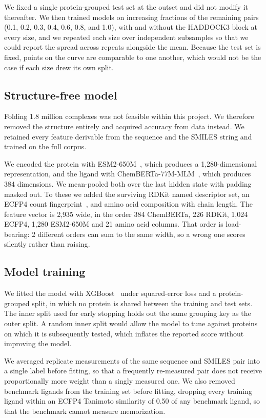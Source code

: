 \documentclass[times, twoside]{zHenriquesLab-StyleBioRxiv}
\begin{document}
We fixed a single protein-grouped test set at the outset and did not modify it thereafter. We then trained models on increasing fractions of the remaining pairs (0.1, 0.2, 0.3, 0.4, 0.6, 0.8, and 1.0), with and without the HADDOCK3 block at every size, and we repeated each size over independent subsamples so that we could report the spread across repeats alongside the mean. Because the test set is fixed, points on the curve are comparable to one another, which would not be the case if each size drew its own split.

\subsection*{Structure-free model}

Folding 1.8 million complexes was not feasible within this project. We therefore removed the structure entirely and acquired accuracy from data instead. We retained every feature derivable from the sequence and the SMILES string and trained on the full corpus.

We encoded the protein with ESM2-650M~\cite{lin2023esm2}, which produces a 1,280-dimensional representation, and the ligand with ChemBERTa-77M-MLM~\cite{ahmad2022chemberta2}, which produces 384 dimensions. We mean-pooled both over the last hidden state with padding masked out. To these we added the surviving RDKit named descriptor set, an ECFP4 count fingerprint~\cite{rogers2010ecfp}, and amino acid composition with chain length. The feature vector is 2,935 wide, in the order 384 ChemBERTa, 226 RDKit, 1,024 ECFP4, 1,280 ESM2-650M and 21 amino acid columns. That order is load-bearing: 2 different orders can sum to the same width, so a wrong one scores silently rather than raising.

\subsection*{Model training}

We fitted the model with XGBoost~\cite{chen2016xgboost} under squared-error loss and a protein-grouped split, in which no protein is shared between the training and test sets. The inner split used for early stopping holds out the same grouping key as the outer split. A random inner split would allow the model to tune against proteins on which it is subsequently tested, which inflates the reported score without improving the model.

We averaged replicate measurements of the same sequence and SMILES pair into a single label before fitting, so that a frequently re-measured pair does not receive proportionally more weight than a singly measured one. We also removed benchmark ligands from the training set before fitting, dropping every training ligand within an ECFP4 Tanimoto similarity of 0.50 of any benchmark ligand, so that the benchmark cannot measure memorization.
\end{document}
